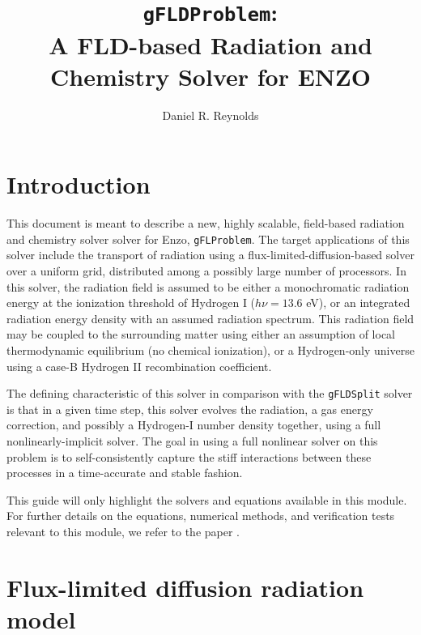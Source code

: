 \documentclass[letterpaper,10pt]{article}
\author{Daniel R. Reynolds}
\title{{\tt gFLDProblem}: \\
A FLD-based Radiation and Chemistry Solver for ENZO}
\renewcommand{\(}{\left(}
\renewcommand{\)}{\right)}
\begin{document}
\maketitle

\section{Introduction}
\label{sec:intro}

This document is meant to describe a new, highly scalable,
field-based radiation and chemistry solver solver for Enzo, 
{\tt gFLProblem}. The target applications of this solver include the
transport of radiation using a flux-limited-diffusion-based solver
over a uniform grid, distributed among a possibly large number of
processors.  In this solver, the radiation field is assumed to be
either a monochromatic radiation energy at the ionization threshold of
Hydrogen I ($h\nu = 13.6$ eV), or an integrated radiation energy
density with an assumed radiation spectrum.  This radiation field may
be coupled to the surrounding matter using either an assumption of
local thermodynamic equilibrium (no chemical ionization), or a
Hydrogen-only universe using a case-B Hydrogen II recombination
coefficient.  

The defining characteristic of this solver in comparison 
with the {\tt gFLDSplit} solver is that in a given time step, this
solver evolves the radiation, a gas energy correction, and possibly a
Hydrogen-I number density together, using a full nonlinearly-implicit
solver.  The goal in using a full nonlinear solver on this problem is
to self-consistently capture the stiff interactions between these
processes in a time-accurate and stable fashion. 

This guide will only highlight the solvers and equations available in
this module.  For further details on the equations, numerical methods,
and verification tests relevant to this module, we refer to the paper 
\cite{ReynoldsHayesPaschosNorman2009}.




\section{Flux-limited diffusion radiation model}
\label{sec:rad_model}
\end{document}
